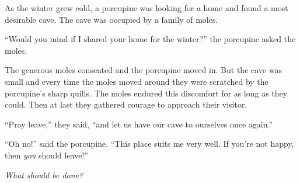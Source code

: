 
{\wsstoryfont
As the winter grew cold, a porcupine was looking for a home and found a most desirable cave. The cave was occupied by a family of moles.

``Would you mind if I shared your home for the winter?'' the porcupine asked the moles.

The generous moles consented and the porcupine moved in. But the cave was small and every time the moles moved around they were scratched by the porcupine's sharp quills. The moles endured this discomfort for as long as they could. Then at last they gathered courage to approach their visitor.

``Pray leave,'' they said, ``and let us have our cave to ourselves once again.''

``Oh no!'' said the porcupine. ``This place suits me very well. If you're not happy, then \textit{you} should leave!''

\textit{What should be done?}

}

